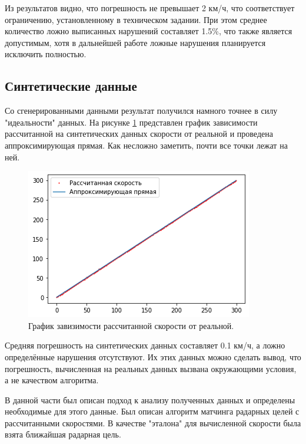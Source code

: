 \documentclass[specification,annotation,times]{itmo-student-thesis}
\begin{document}
Из результатов видно, что погрешность не превышает 2 км/ч, что соответствует ограничению, установленному в техническом задании. При этом среднее количество ложно выписанных нарушений составляет 1.5\%, что также является допустимым, хотя в дальнейшей работе ложные нарушения планируется исключить полностью.


\subsection{Синтетические данные}

Со сгенерированными данными результат получился намного точнее в силу "идеальности" данных. На рисунке \ref{img:ideal} представлен график зависимости рассчитанной на синтетических данных скорости от реальной и проведена аппроксимирующая прямая. Как несложно заметить, почти все точки лежат на ней.

\begin{figure}[!ht]
	\caption{График завизимости рассчитанной скорости от реальной.}\label{img:ideal}
	\includegraphics[width=0.85\linewidth]{../png/ideal_plot.png}
	\centering
\end{figure}

Средняя погрешность на синтетических данных составляет 0.1 км/ч, а ложно определённые нарушения отсутствуют. Их этих данных можно сделать вывод, что погрешность, вычисленная на реальных данных вызвана окружающими условия, а не качеством алгоритма.

\chapterconclusion
В данной части был описан подход к анализу полученных данных и определены необходимые для этого данные. Был описан алгоритм матчинга радарных целей с рассчитанными скоростями. В качестве "эталона" для вычисленной скорости была взята ближайшая радарная цель.
\end{document}
